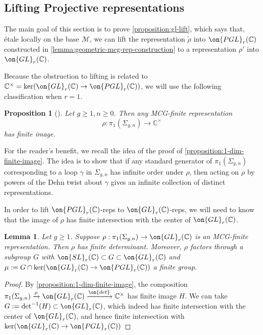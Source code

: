 \documentclass[12 pt]{amsart}
\theoremstyle{plain}
\newtheorem{proposition}[subsubsection]{Proposition}
\newtheorem{lemma}[subsubsection]{Lemma}
\theoremstyle{definition}
\theoremstyle{remark}
\numberwithin{equation}{section}
\begin{document}
\subsection{Lifting Projective representations}
\label{subsection:lifting-projective}

The main goal of this section is to prove \autoref{proposition:gl-lift},
which says that, \'etale locally on the base $\mathscr{M}$, we can lift the representation $\widetilde{\rho}$ into
$\on{PGL}_r(\mathbb C)$
constructed in \autoref{lemma:geometric-mcg-rep-construction}
to a representation $\rho'$ into $\on{GL}_r(\mathbb C)$.

Because the obstruction to lifting is related to $\mathbb C^\times =
\ker(\on{GL}_r(\mathbb C) \to
\on{PGL}_r(\mathbb C))$, we will use the following classification when
$r = 1$.

\begin{proposition}[]
	\label{proposition:1-dim-finite-image}
	Let $g\geq 1, n\geq 0$. Then any MCG-finite representation $$\rho: \pi_1(\Sigma_{g,n})\to \mathbb{C}^\times$$ has finite image.
\end{proposition}
For the reader's benefit, we recall the idea of the proof of
\autoref{proposition:1-dim-finite-image}.
The idea is to show
that if any standard generator of $\pi_1(\Sigma_{g,n})$ corresponding to a loop
$\gamma$ in $\Sigma_{g,n}$ has infinite order under $\rho$, then acting on $\rho$ by powers of the
Dehn twist about $\gamma$ gives an infinite collection of distinct
representations.

In order to lift 
$\on{PGL}_r(\mathbb C)$-reps to
$\on{GL}_r(\mathbb C)$-reps, 
we will need to know 
that the image of $\rho$ has finite
intersection with the center of $\on{GL}_r(\mathbb C)$.
\begin{lemma}
	\label{lemma:finite-central-part}
	Let $g\geq 1$.
	Suppose $\rho: \pi_1(\Sigma_{g,n}) \to \on{GL}_r(\mathbb C)$ is an MCG-finite representation.
	Then $\rho$ has finite determinant.
	Moreover, $\rho$ factors through a subgroup $G$ with $\on{SL}_r(\mathbb C) \subset G
	\subset \on{GL}_r(\mathbb C)$ and $\mu := G \cap \ker(\on{GL}_r(\mathbb
	C) \to \on{PGL}_r(\mathbb C))$ a finite group.
\end{lemma}
\begin{proof}
	By \autoref{proposition:1-dim-finite-image}, the composition
	$\pi_1(\Sigma_{g,n}) \xrightarrow{\rho} \on{GL}_r(\mathbb C) \xrightarrow{\on{det}}
	\mathbb C^\times$ has finite image $H$.
	We can take $G := \det^{-1}(H) \subset \on{GL}_r(\mathbb{C})$,
	which indeed has finite intersection with the center of
	$\on{GL}_r(\mathbb C)$, and hence finite intersection with
	$\ker(\on{GL}_r(\mathbb C) \to \on{PGL}_r(\mathbb C))$
\end{proof}
\end{document}
